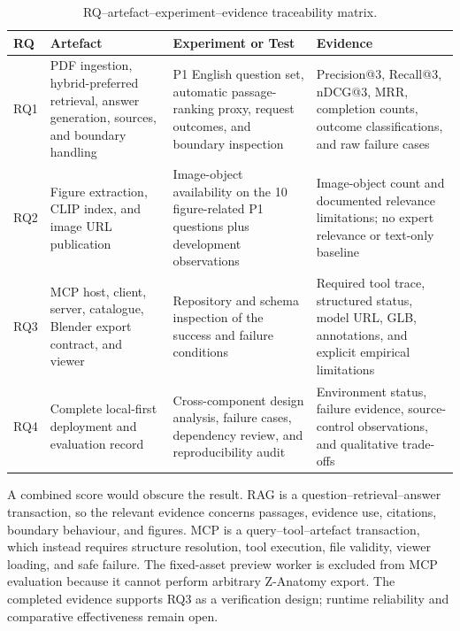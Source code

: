 {\scriptsize
\setlength{\tabcolsep}{3pt}
\renewcommand{\arraystretch}{1.02}
\begin{table}[htbp]
  \centering
  \caption{RQ--artefact--experiment--evidence traceability matrix.}
  \label{tab:rq-traceability}
  \begin{tabularx}{\textwidth}{L{0.06\textwidth} L{0.23\textwidth} Y Y}
    \toprule
    RQ & Artefact & Experiment or Test & Evidence \\
    \midrule
    RQ1 &
    PDF ingestion, hybrid-preferred retrieval, answer generation, sources, and boundary handling &
    P1 English question set, automatic passage-ranking proxy, request outcomes, and boundary inspection &
    Precision@3, Recall@3, nDCG@3, MRR, completion counts, outcome classifications, and raw failure cases \\

    RQ2 &
    Figure extraction, CLIP index, and image URL publication &
    Image-object availability on the 10 figure-related P1 questions plus development observations &
    Image-object count and documented relevance limitations; no expert relevance or text-only baseline \\

    RQ3 &
    MCP host, client, server, catalogue, Blender export contract, and viewer &
    Repository and schema inspection of the success and failure conditions &
    Required tool trace, structured status, model URL, GLB, annotations, and explicit empirical limitations \\

    RQ4 &
    Complete local-first deployment and evaluation record &
    Cross-component design analysis, failure cases, dependency review, and reproducibility audit &
    Environment status, failure evidence, source-control observations, and qualitative trade-offs \\
    \bottomrule
  \end{tabularx}
\end{table}
}

A combined score would obscure the result. RAG is a question--retrieval--answer transaction, so the relevant evidence concerns passages, evidence use, citations, boundary behaviour, and figures. MCP is a query--tool--artefact transaction, which instead requires structure resolution, tool execution, file validity, viewer loading, and safe failure. The fixed-asset preview worker is excluded from MCP evaluation because it cannot perform arbitrary Z-Anatomy export. The completed evidence supports RQ3 as a verification design; runtime reliability and comparative effectiveness remain open.

